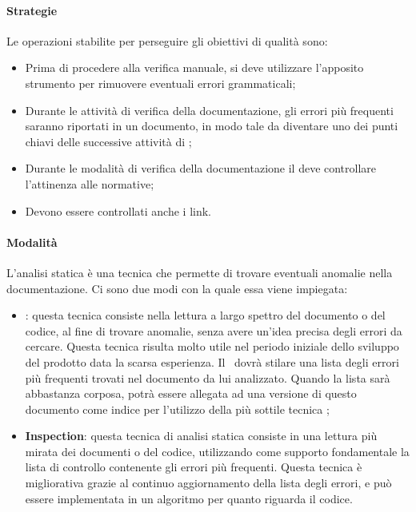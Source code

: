 \documentclass[../NormeDiProgetto_v3.0.0.tex]{subfiles}
\begin{document}
			\paragraph{Strategie}
				Le operazioni stabilite per perseguire gli obiettivi di qualità sono:
				\begin{itemize}
					\item Prima di procedere alla verifica manuale, si deve utilizzare l'apposito strumento per rimuovere eventuali errori grammaticali;
					\item Durante le attività di verifica della documentazione, gli errori più frequenti saranno riportati in un documento, in modo tale da diventare uno dei punti chiavi delle successive attività di ;
					\item Durante le modalità di verifica della documentazione il \verificatore deve controllare l'attinenza alle normative;
					\item Devono essere controllati anche i link.
				\end{itemize}

			\paragraph{Modalità}
				L'analisi statica è una tecnica che permette di trovare eventuali anomalie nella
				documentazione. Ci sono due modi con la quale essa viene
				impiegata:
				\begin{itemize}
				\item \textbf{}: questa tecnica consiste nella lettura a largo spettro del documento o del codice, al fine di trovare anomalie, senza avere un'idea precisa degli errori da cercare.
				Questa tecnica risulta molto utile nel periodo iniziale dello sviluppo del prodotto data la scarsa esperienza. Il \verificatore\ dovrà stilare una lista degli errori più frequenti trovati nel documento da lui analizzato. Quando la lista sarà abbastanza corposa, potrà essere allegata ad una versione di questo documento come indice per l'utilizzo della più sottile tecnica ;		
				\item \textbf{Inspection}: questa tecnica di analisi statica consiste in una lettura più mirata dei documenti o del codice, utilizzando come supporto fondamentale la lista di controllo contenente gli errori più frequenti. Questa tecnica è migliorativa grazie al continuo aggiornamento della lista degli errori, e può essere implementata in un algoritmo per quanto riguarda il codice.
				\end{itemize}
\end{document}
